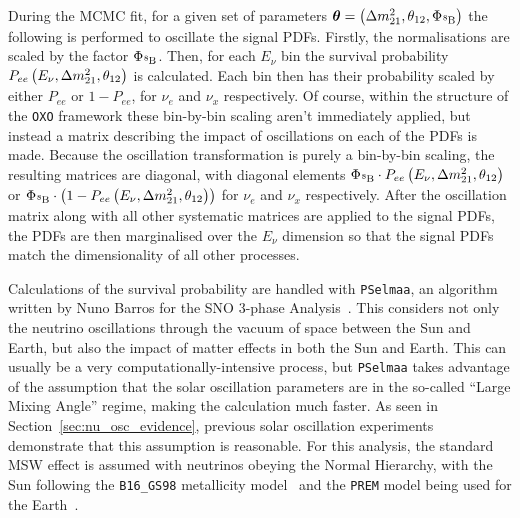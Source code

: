 During the MCMC fit, for a given set of parameters $\bm{\theta} = \left(\dmsq{}, \tonetwo{}, \Phi_{\ce{^{8}B}}\right)$ the following is performed to oscillate the signal PDFs. Firstly, the normalisations are scaled by the factor $\Phi_{\ce{^{8}B}}$. Then, for each $E_{\nu}$ bin the survival probability $P_{ee}\left(E_{\nu}, \Delta m^{2}_{21}{}, \theta_{12}{}\right)$ is calculated. Each bin then has their probability scaled by either $P_{ee}$ or $1-P_{ee}$, for $\nu_{e}$ and $\nu_{x}$ respectively. Of course, within the structure of the \texttt{OXO} framework these bin-by-bin scaling aren't immediately applied, but instead a matrix describing the impact of oscillations on each of the PDFs is made. Because the oscillation transformation is purely a bin-by-bin scaling, the resulting matrices are diagonal, with diagonal elements $\Phi_{\ce{^{8}B}}\cdot P_{ee}\left(E_{\nu}, \dmsq{}, \tonetwo{}\right)$ or $\Phi_{\ce{^{8}B}}\cdot\left(1-P_{ee}\left(E_{\nu}, \dmsq{}, \tonetwo{}\right)\right)$ for $\nu_{e}$ and $\nu_{x}$ respectively. After the oscillation matrix along with all other systematic matrices are applied to the signal PDFs, the PDFs are then marginalised over the $E_{\nu}$ dimension so that the signal PDFs match the dimensionality of all other processes.

Calculations of the survival probability are handled with \texttt{PSelmaa}, an algorithm written by Nuno Barros for the SNO 3-phase Analysis~\cite{}. %
This considers not only the neutrino oscillations through the vacuum of space between the Sun and Earth, but also the impact of matter effects in both the Sun and Earth. This can usually be a very computationally-intensive process, but \texttt{PSelmaa} takes advantage of the assumption that the solar oscillation parameters are in the so-called ``Large Mixing Angle'' regime, making the calculation much faster. As seen in Section~\ref{sec:nu_osc_evidence}, %
previous solar oscillation experiments demonstrate that this assumption is reasonable. For this analysis, the standard MSW effect is assumed with neutrinos obeying the Normal Hierarchy, with the Sun following the \texttt{B16\_GS98} metallicity model~\cite{} %
and the \texttt{PREM} model being used for the Earth~\cite{}. %

